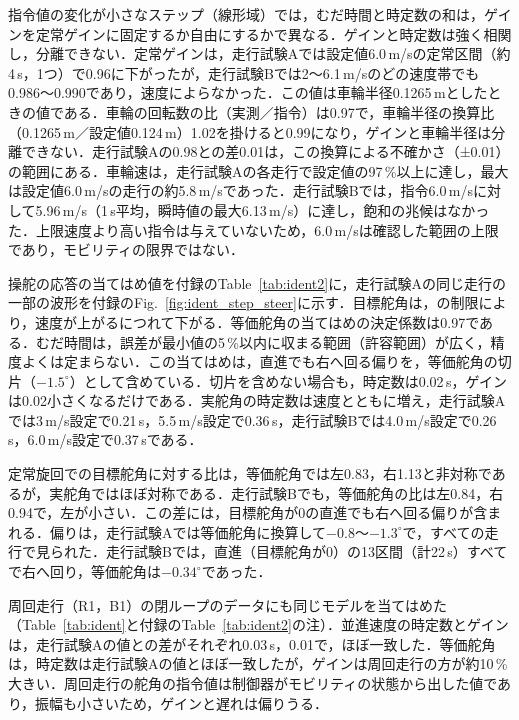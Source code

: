 指令値の変化が小さなステップ（線形域）では，むだ時間と時定数の和は，ゲインを定常ゲインに固定するか自由にするかで異なる．ゲインと時定数は強く相関し，分離できない．定常ゲインは，走行試験Aでは設定値6.0\,m/sの定常区間（約4\,s，1つ）で0.96に下がったが，走行試験Bでは2〜6.1\,m/sのどの速度帯でも0.986〜0.990であり，速度によらなかった．この値は車輪半径0.1265\,mとしたときの値である．車輪の回転数の比（実測／指令）は0.97で，車輪半径の換算比（0.1265\,m／設定値0.124\,m）1.02を掛けると0.99になり，ゲインと車輪半径は分離できない．走行試験Aの0.98との差0.01は，この換算による不確かさ（±0.01）の範囲にある．車輪速は，走行試験Aの各走行で設定値の97\,\%以上に達し，最大は設定値6.0\,m/sの走行の約5.8\,m/sであった．走行試験Bでは，指令6.0\,m/sに対して5.96\,m/s（1\,s平均，瞬時値の最大6.13\,m/s）に達し，飽和の兆候はなかった．上限速度より高い指令は与えていないため，6.0\,m/sは確認した範囲の上限であり，モビリティの限界ではない．

操舵の応答の当てはめ値を付録のTable~\ref{tab:ident2}に，走行試験Aの同じ走行の一部の波形を付録のFig.~\ref{fig:ident_step_steer}に示す．目標舵角は，の制限により，速度が上がるにつれて下がる．等価舵角の当てはめの決定係数は0.97である．むだ時間は，誤差が最小値の5\,\%以内に収まる範囲（許容範囲）が広く，精度よくは定まらない．この当てはめは，直進でも右へ回る偏りを，等価舵角の切片（$-1.5^\circ$）として含めている．切片を含めない場合も，時定数は0.02\,s，ゲインは0.02小さくなるだけである．実舵角の時定数は速度とともに増え，走行試験Aでは3\,m/s設定で0.21\,s，5.5\,m/s設定で0.36\,s，走行試験Bでは4.0\,m/s設定で0.26\,s，6.0\,m/s設定で0.37\,sである．

定常旋回での目標舵角に対する比は，等価舵角では左0.83，右1.13と非対称であるが，実舵角ではほぼ対称である．走行試験Bでも，等価舵角の比は左0.84，右0.94で，左が小さい．この差には，目標舵角が0の直進でも右へ回る偏りが含まれる．偏りは，走行試験Aでは等価舵角に換算して$-0.8$〜$-1.3^\circ$で，すべての走行で見られた．走行試験Bでは，直進（目標舵角が0）の13区間（計22\,s）すべてで右へ回り，等価舵角は$-0.34^\circ$であった．

周回走行（R1，B1）の閉ループのデータにも同じモデルを当てはめた（Table~\ref{tab:ident}と付録のTable~\ref{tab:ident2}の注）．並進速度の時定数とゲインは，走行試験Aの値との差がそれぞれ0.03\,s，0.01で，ほぼ一致した．等価舵角は，時定数は走行試験Aの値とほぼ一致したが，ゲインは周回走行の方が約10\,\%大きい．周回走行の舵角の指令値は制御器がモビリティの状態から出した値であり，振幅も小さいため，ゲインと遅れは偏りうる．

